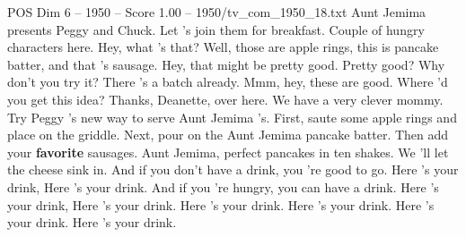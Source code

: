 \begin{textsample}{POS Dim 6 – 1950 – Score 1.00 – 1950/tv\_com\_1950\_18.txt}  \label{ex:f6_pos_019}
Aunt Jemima presents Peggy and Chuck.
Let 's join them for breakfast.
Couple of hungry characters here.
Hey, what 's that?
Well, those are apple rings, this is pancake batter, and that 's sausage.
Hey, that might be pretty good.
Pretty good?
Why don't you try it?
There 's a batch already.
Mmm, hey, these are good.
Where 'd you get this idea?
Thanks, Deanette, over here.
We have a very clever mommy.
Try Peggy 's new way to serve Aunt Jemima 's.
First, saute some apple rings and place on the griddle.
Next, pour on the Aunt Jemima pancake batter.
Then add your \textbf{favorite} sausages.
Aunt Jemima, perfect pancakes in ten shakes.
We 'll let the cheese sink in.
And if you don't have a drink, you 're good to go.
Here 's your drink, Here 's your drink.
And if you 're hungry, you can have a drink.
Here 's your drink, Here 's your drink.
Here 's your drink.
Here 's your drink.
Here 's your drink.
Here 's your drink.

\end{textsample}

